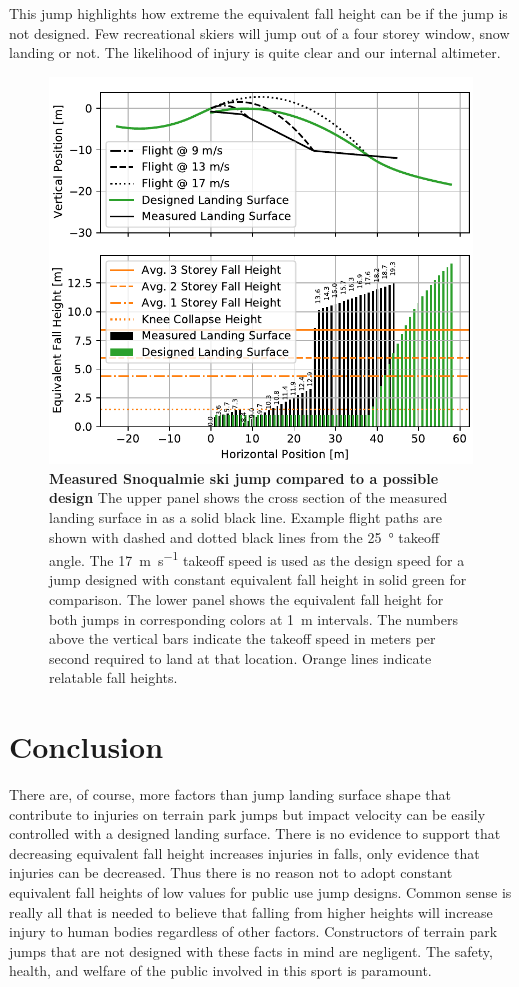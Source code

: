 \documentclass{article}
\begin{document}
This jump highlights how extreme the equivalent fall height can be if the jump
is not designed. Few recreational skiers will jump out of a four storey window,
snow landing or not. The likelihood of injury is quite clear and our internal
altimeter.
%
\begin{figure}
  \centering
  \includegraphics[width=5.25in]{figures/salvini-v-snoqualmie.pdf}
  \caption{\textbf{Measured Snoqualmie ski jump compared to a possible design}
  The upper panel shows the cross section of the measured landing surface in as
  a solid black line. Example flight paths are shown with dashed and dotted
  black lines from the 25~\si{\degree} takeoff angle. The
  17~\si{\meter\per\second} takeoff speed is used as the design speed for a
  jump designed with constant equivalent fall height in solid green for
  comparison. The lower panel shows the equivalent fall height for both jumps
  in corresponding colors at 1~\si{\meter} intervals. The numbers above the
  vertical bars indicate the takeoff speed in meters per second required to
  land at that location. Orange lines indicate relatable fall heights.}
  \label{fig:salvini-v-snoqualmie}
\end{figure}

\section{Conclusion}
%
There are, of course, more factors than jump landing surface shape that
contribute to injuries on terrain park jumps but impact velocity can be easily
controlled with a designed landing surface. There is no evidence to support
that decreasing equivalent fall height increases injuries in falls, only
evidence that injuries can be decreased. Thus there is no reason not to adopt
constant equivalent fall heights of low values for public use jump designs.
Common sense is really all that is needed to believe that falling from higher
heights will increase injury to human bodies regardless of other factors.
Constructors of terrain park jumps that are not designed with these facts in
mind are negligent. The safety, health, and welfare of the public involved in
this sport is paramount.



\end{document}
